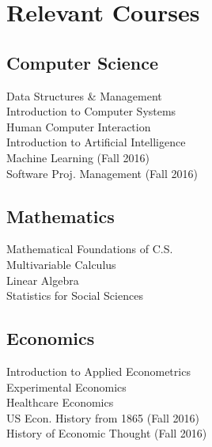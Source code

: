 
\section{Relevant Courses}
\subsection{Computer Science}
Data Structures \& Management\\
Introduction to Computer Systems\\
Human Computer Interaction\\
Introduction to Artificial Intelligence\\
Machine Learning (Fall 2016)\\
Software Proj. Management (Fall 2016)\\
\sectionsep

\subsection{Mathematics}
Mathematical Foundations of C.S.\\
Multivariable Calculus\\
Linear Algebra\\
Statistics for Social Sciences\\
\sectionsep

\subsection{Economics}
Introduction to Applied Econometrics\\
Experimental Economics\\
Healthcare Economics\\
US Econ. History from 1865 (Fall 2016)\\
History of Economic Thought (Fall 2016)\\
\sectionsep
